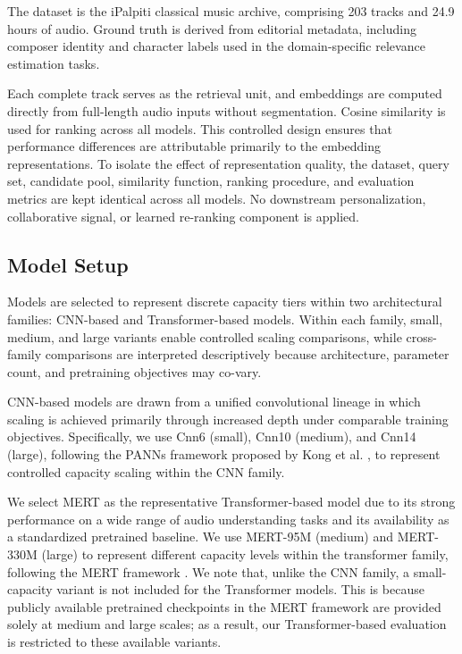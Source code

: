 \documentclass[sigconf]{acmart}
\begin{document}
The dataset is the iPalpiti classical music archive, comprising 203 tracks and 24.9 hours of audio. Ground truth is derived from editorial metadata, including composer identity and character labels used in the domain-specific relevance estimation tasks.

Each complete track serves as the retrieval unit, and embeddings are computed directly from full-length audio inputs without segmentation. Cosine similarity is used for ranking across all models. This controlled design ensures that performance differences are attributable primarily to the embedding representations. To isolate the effect of representation quality, the dataset, query set, candidate pool, similarity function, ranking procedure, and evaluation metrics are kept identical across all models. No downstream personalization, collaborative signal, or learned re-ranking component is applied.

\subsection{Model Setup}
Models are selected to represent discrete capacity tiers within two architectural families: CNN-based and Transformer-based models. Within each family, small, medium, and large variants enable controlled scaling comparisons, while cross-family comparisons are interpreted descriptively because architecture, parameter count, and pretraining objectives may co-vary.

CNN-based models are drawn from a unified convolutional lineage in which scaling is achieved primarily through increased depth under comparable training objectives. Specifically, we use Cnn6 (small), Cnn10 (medium), and Cnn14 (large), following the PANNs framework proposed by Kong et al. \cite{kong2020panns}, to represent controlled capacity scaling within the CNN family.

We select MERT as the representative Transformer-based model due to its strong performance on a wide range of audio understanding tasks and its availability as a standardized pretrained baseline. We use MERT-95M (medium) and MERT-330M (large) to represent different capacity levels within the transformer family, following the MERT framework \cite{li2023mert}. We note that, unlike the CNN family, a small-capacity variant is not included for the Transformer models. This is because publicly available pretrained checkpoints in the MERT framework are provided solely at medium and large scales; as a result, our Transformer-based evaluation is restricted to these available variants.
\end{document}
